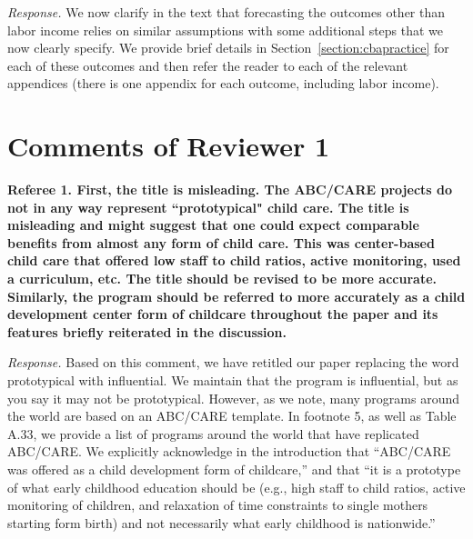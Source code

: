 \noindent \textit{Response.} We now clarify in the text that forecasting the outcomes other than labor income relies on similar assumptions with some additional steps that we now clearly specify. We provide brief details in Section~\ref{section:cbapractice} for each of these outcomes and then refer the reader to each of the relevant appendices (there is one appendix for each outcome, including labor income).

\section*{Comments of Reviewer 1}

\noindent \textbf{Referee 1. First, the title is misleading. The ABC/CARE projects do not in any way represent ``prototypical" child care. The title is misleading and might suggest that one could expect comparable benefits from almost any form of child care. This was center-based child care that offered low staff to child ratios, active monitoring, used a curriculum, etc. The title should be revised to be more accurate. Similarly, the program should be referred to more accurately as a child development center form of childcare throughout the paper and its features briefly reiterated in the discussion.}

\noindent \textit{Response.} Based on this comment, we have retitled our paper replacing the word prototypical with influential. We maintain that the program is influential, but as you say it may not be prototypical. However, as we note, many programs around the world are based on an ABC/CARE template. In footnote 5, as well as Table A.33, we provide a list of programs around the world that have replicated ABC/CARE. We explicitly acknowledge in the introduction that ``ABC/CARE was offered as a child development form of childcare,'' and that ``it is a prototype of what early childhood education should be (e.g., high staff to child ratios, active monitoring of children, and relaxation of time constraints to single mothers starting form birth) and not necessarily what early childhood is nationwide.''

